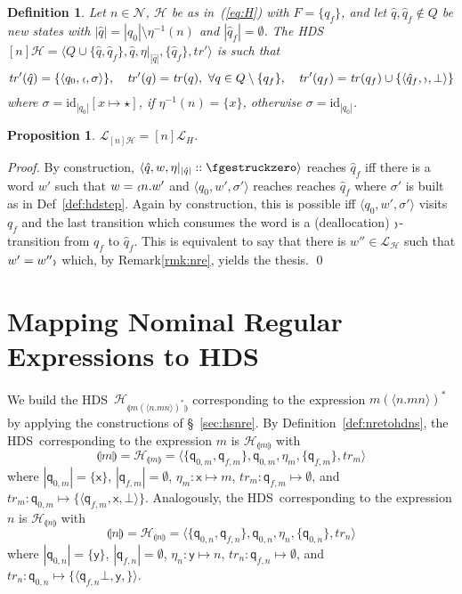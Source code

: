 \documentclass[runningheads,a4paper]{llncs}
\newcommand{\hdof}[1]{\mathcal H_{\nretohds{#1}}}
\newcommand{\nrebinder}[1]{\tuple{#1}}
\newcommand{\q}{\mathsf{q}}
\newcommand{\x}{\mathsf{x}}
\newcommand{\y}{\mathsf{y}}
\newcommand{\longversion}[1]{#1}
\newcommand{\oscope}{\mbox{\tiny$\langle\!\!\langle$}}
\newcommand{\cscope}{\mbox{\tiny$\rangle\!\!\rangle$}}
\newcommand{\nretohds}[1]{\llparenthesis #1 \rrparenthesis}
\newcommand{\estk}{\fgestruckzero}
\newcommand{\trans}{\mathit{tr}}
\newcommand{\lang}[1]{\mathcal{L}_{#1}}
\newcommand{\fresh}{\star}
\newcommand{\weight}[1]{|#1|}
\newcommand{\id}[1]{\mathrm{id}_{#1}}
\newcommand{\upd}[2]{[{#1} \mapsto {#2}]}
\newcommand{\hdns}{HDS}
\newcommand{\names}{\mbox{$\mathcal{N}$}}
\newtheorem{definition}{Theorem}[section]
\newtheorem{proposition}{Theorem}[section]
\newtheorem{definition}{Definition}[section]
\newtheorem{proposition}{Proposition}[section]
\newcommand{\tuple}[1]{\langle#1\rangle}
\newcommand{\hdtr}[3]{\tuple{#2,#1,#3}}
\begin{document}
\begin{definition}\label{def:[n]H}
  Let $n \in \names$, $\mathcal H$ be as in~(\ref{eq:H}) with $F =
  \{q_f\}$, and let $\hat q, \hat q_f \not\in Q$ be new states with
  $\weight{\hat q} = \weight{q_0} \setminus \eta^{-1}(n)$ and
  $\weight{\hat q_f} = \emptyset$.
The \hdns\ $[n]\mathcal H = \tuple{Q \cup \{\hat q, \hat q_f\}, \hat
    q, \eta|_{\weight{\hat q}}, \{\hat q_f\}, \trans'}$ is such that
  \[
    \trans'(\hat q)  =  \{\hdtr \oscope {q_0} \sigma\},
    \quad
    \trans'(q)  =  \trans(q),
    \ \forall q \in Q \setminus \{ q_f \},
    \quad
    \trans'(q_f) = \trans(q_f) \cup \{\hdtr \cscope {\hat q_f} \bot\}
  \]
  where $\sigma = \id{\weight{q_0}}\upd x \fresh$, if
  $\eta^{-1}(n) = \{x\}$, otherwise $\sigma = \id{\weight{q_0}}$.
\end{definition}

\begin{proposition}\label{prop:[n]H}
  $\lang{[n]\mathcal H} = [n]\lang{H}$.
\end{proposition}
\longversion{
\begin{proof}
  By construction, $\tuple{\hat q, w, \eta|_{\weight{\hat q}}::\estk}$
  reaches $\hat q_f$ iff there is a word $w'$ such that $w = \oscope n
  . w'$ and $\tuple{q_0, w', \sigma'}$ reaches reaches $\hat q_f$ where
  $\sigma'$ is built as in Def~\ref{def:hdstep}.
Again by construction, this is possible iff $\tuple{q_0, w',
    \sigma'}$ visits $q_f$ and the last transition which consumes the
  word is a (deallocation) $\cscope$-transition from $q_f$ to $\hat
  q_f$.
This is equivalent to say that there is $w'' \in \lang{\mathcal H}$
  such that $w' = w''\cscope$ which, by Remark\ref{rmk:nre}, yields
  the thesis.
\qed
\end{proof}
}



\section{Mapping Nominal Regular Expressions to \hdns}
We build the \hdns\ $\hdof{m(\nrebinder{n.mn})^\ast}$ corresponding
to the expression $m(\nrebinder{n.mn})^\ast$ by applying the
constructions of \S~\ref{sec:hsnre}.
By Definition~\ref{def:nretohdns}, the \hdns\ corresponding to the
expression $m$ is $\hdof m$ with
\begin{equation}\label{eq:Hm}
\nretohds m = \hdof m = \tuple{\{\q_{0,m},\q_{f,m}\}, \q_{0,m}, \eta_m,
  \{\q_{f,m}\}, \trans_m}
\end{equation}
where $\weight{\q_{0,m}} = \{\x\}$, $\weight{\q_{f,m}} = \emptyset$,
$\eta_m \colon \x \mapsto m$, $\trans_m \colon \q_{f,m} \mapsto
\emptyset$, and $\trans_m \colon \q_{0,m} \mapsto \{\hdtr \x {\q_{f,m}}
\bot\}$.
Analogously, the \hdns\ corresponding to the expression $n$ is $\hdof
n$ with
\[
\nretohds n = \hdof n = \tuple{\{\q_{0,n},\q_{f,n}\}, \q_{0,n}, \eta_n,
  \{\q_{0,n}\}, \trans_n}
\]
where $\weight{\q_{0,n}} = \{\y\}$, $\weight{\q_{f,n}} = \emptyset$,
$\eta_n \colon \y \mapsto n$, $\trans_n \colon \q_{f,n} \mapsto
\emptyset$, and $\trans_n \colon \q_{0,n} \mapsto
\{\hdtr \y {\q_{f,n} \bot}\}$.
\end{document}
